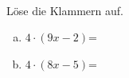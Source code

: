 \begin{aufgabe} ~ \\ 
Löse die Klammern auf.\begin{multicols}{2} 
\begin{enumerate}[a)] 
\item 
$4\cdot(9x-2)$=
\item 
$4\cdot(8x-5)$=
\end{enumerate} 
\end{multicols} 
\end{aufgabe} 
